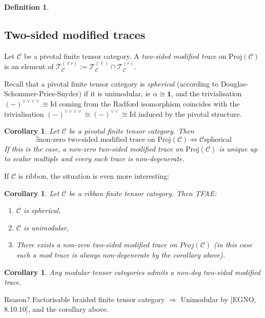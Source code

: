 \documentclass[11pt]{article}
\newcommand{\C}{\mathcal{C}}
\newtheorem{corollary}[theorem]{Corollary}
\theoremstyle{definition}
\newtheorem{definition}[theorem]{Definition}
\begin{document}
\begin{definition}
\subsection{Two-sided modified traces}


Let $\mathcal{C}$ be a pivotal finite tensor category. A \emph{two-sided modified trace}
on $\mathrm{Proj}(\mathcal{C})$ is an element of $\mathcal{T}_{\mathcal{C}}^{(\ell r)} :=
\mathcal{T}_{\mathcal{C}}^{(\ell)} \cap \mathcal{T}_{\mathcal{C}}^{(r)}$.


Recall that a pivotal finite tensor category is \textit{spherical} (according to Douglas-Schommer-Pries-Snyder) if it is unimodular, ie $\alpha \cong \mathbf{1}$, and the trivialisation $(-)^{\vee \vee \vee \vee} \cong \mathrm{Id}$ coming from the Radford isomorphism coincides with the   trivialisation $(-)^{\vee \vee \vee \vee} \cong (-)^{ \vee \vee} \cong  \mathrm{Id}$ induced by the pivotal structure.



\begin{corollary}
Let $\mathcal{C}$ be a pivotal finite tensor category. Then 
$$ \exists
\textrm{
 non-zero
two-sided modified trace on } \mathrm{Proj}(\mathcal{C}) \iff \mathcal{C} \text{
spherical} $$ If this is the case, a non-zero two-sided modified trace on
$\mathrm{Proj}(\mathcal{C})$ is unique up to scalar multiple and every such trace is
non-degenerate.
\end{corollary}




If $\C$ is ribbon, the situation is even more interesting:


\begin{corollary}
Let $\C$ be a ribbon finite tensor category. Then TFAE:
\begin{enumerate}
\item $\C$ is spherical,
\item $\C$ is unimodular,
\item There exists a non-zero two-sided modified trace on $Proj (\C)$ (in this case such a mod trace is always non-degenerate by the corollary above).
\end{enumerate}
\end{corollary}



\begin{corollary}
Any modular tensor categories admits a non-deg two-sided modified trace.
\end{corollary}

Reason? Factorisable braided finite tensor category $\Rightarrow$ Unimodular by [EGNO, 8.10.10], and the corollary above.


\end{definition}
\end{document}
